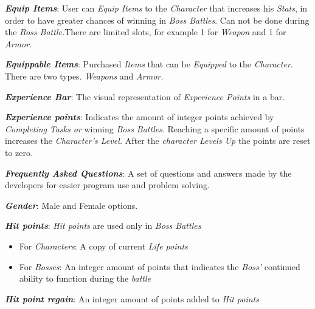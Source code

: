 \documentclass[12pt]{report}
\renewcommand{\_}{\kern-1.5pt\textunderscore\kern-1.5pt}
\begin{document}
\textbf{\textit{\textcolor[HTML]{222222}{Equip Items}}}\textcolor[HTML]{222222}{: User can \textit{Equip Items} to the \textit{Character} that increases his \textit{Stats}, in order to have greater chances of winning in \textit{Boss Battles}. Can not be done during the\textit{ Boss Battle.}There are limited slots, for example 1 for \textit{Weapon} and 1 for \textit{Armor.}}\par

\textbf{\textit{Equippable Items}}: Purchased \textit{Items} that can be \textit{Equipped} to the \textit{Character}. There are two types. \textit{Weapons} and \textit{Armor.}\par

\textbf{\textit{Experience Bar}}: The visual representation of \textit{Experience Points }in a bar. \par

\textbf{\textit{Experience points}}: Indicates the amount of integer points achieved by \textit{Completing} \textit{Tasks or }winning\textit{ Boss Battles}. Reaching a specific amount of points increases the \textit{Character’s Level. }After the \textit{character Levels Up }the points are reset to zero\textit{.}\par

\textbf{\textit{Frequently Asked Questions}}: A set of questions and answers made by the developers for easier program use and problem solving.\par

\textbf{\textit{Gender}}: Male and Female options.\par

\newpage
\textbf{\textit{Hit points}}: \textit{Hit points} are used only in \textit{Boss Battles}\par

\begin{itemize}
	\item For\textit{ Characters}: A copy of current \textit{Life points}\par

	\item For \textit{Bosses}: An integer amount of points \textcolor[HTML]{222222}{that indicates the \textit{Boss’ }}continued ability to function during the\textit{ battle}
\end{itemize}\par

\vspace{\baselineskip}
\textbf{\textit{Hit point regain}}: An integer amount of points added to\textit{ Hit points }\par
\end{document}
